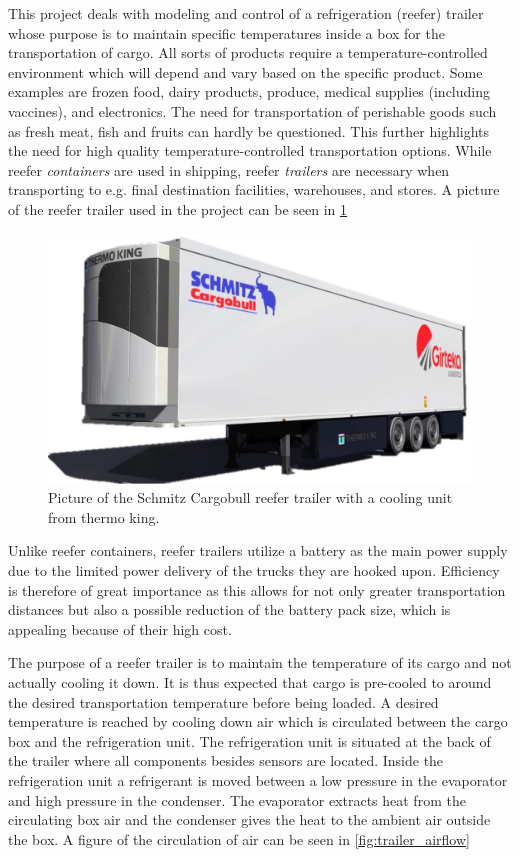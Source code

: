 This project deals with modeling and control of a refrigeration (reefer) trailer whose purpose is to maintain specific temperatures inside a box for the transportation of cargo. All sorts of products require a temperature-controlled environment which will depend and vary based on the specific product. Some examples are frozen food, dairy products, produce, medical supplies (including vaccines), and electronics. The need for transportation of perishable goods such as fresh meat, fish and fruits can hardly be questioned. This further highlights the need for high quality temperature-controlled transportation options. While reefer \textit{containers} are used in shipping, reefer \textit{trailers} are necessary when transporting to e.g. final destination facilities, warehouses, and stores. A picture of the reefer trailer used in the project can be seen in \cref{fig:trailer_picture}

\begin{figure}[h]
	\centering
	\includegraphics[width = 0.55\linewidth]{Graphics/3d_draw_trailer.jpg}
	\caption{Picture of the Schmitz Cargobull reefer trailer with a cooling unit from thermo king.}
	\label{fig:trailer_picture}
\end{figure}

Unlike reefer containers, reefer trailers utilize a battery as the main power supply due to the limited power delivery of the trucks they are hooked upon. Efficiency is therefore of great importance as this allows for not only greater transportation distances but also a possible reduction of the battery pack size, which is appealing because of their high cost.

The purpose of a reefer trailer is to maintain the temperature of its cargo and not actually cooling it down. It is thus expected that cargo is pre-cooled to around the desired transportation temperature before being loaded. A desired temperature is reached by cooling down air which is circulated between the cargo box and the refrigeration unit. The refrigeration unit is situated at the back of the trailer where all components besides sensors are located. Inside the refrigeration unit a refrigerant is moved between a low pressure in the evaporator and high pressure in the condenser. The evaporator extracts heat from the circulating box air and the condenser gives the heat to the ambient air outside the box. A figure of the circulation of air can be seen in \cref{fig:trailer_airflow}


